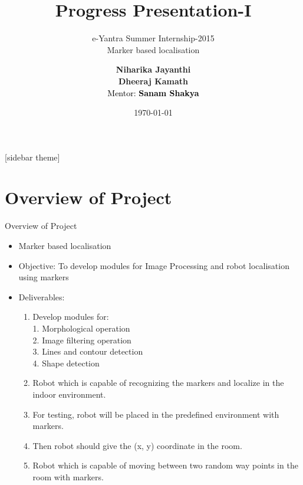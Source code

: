 \documentclass[10pt, a4paper]{beamer}
\begin{document}
	\title{Progress Presentation-I}
	\subtitle{e-Yantra Summer Internship-2015 \\ Marker based localisation }
	\author{\textbf{Niharika Jayanthi}\\ \textbf{Dheeraj Kamath}\\
	\textcolor{black}{Mentor: \textbf{Sanam Shakya}}}
	\date{\today}
	\frame{\titlepage}

[sidebar theme]
\section{Overview of Project}
\begin{frame}{Overview of Project}

	\begin{itemize}
		\pause
		\item  Marker based localisation
		\pause
		\item Objective: To develop modules for Image Processing and robot localisation using markers
		\pause
		\item Deliverables:\begin{enumerate}
			\item Develop modules for: \\
			      1. Morphological operation \\
			      2. Image filtering operation \\
			      3. Lines and contour detection \\
			      4. Shape detection
			\pause
			\item 	Robot which is capable of recognizing the markers and localize in the indoor environment. 
			\pause
			\item   For testing, robot will be placed in the predefined environment with markers. 
			\pause
			\item Then robot should give the (x, y) coordinate in the room.
			\pause
			\item 	Robot which is capable of moving between two random way points in the room with markers.
		 	
		                     \end{enumerate}
	\end{itemize}
\end{frame}
\end{document}
